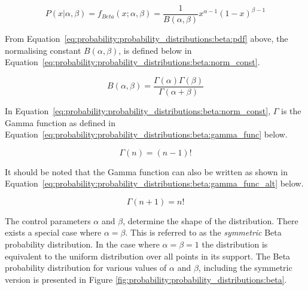 \begin{equation}
      \label{eq:probability:probability_distributions:beta:pdf}
      P(x \vert \alpha, \beta) = f_{Beta}(x; \alpha, \beta) = \frac{1}{B(\alpha, \beta)} x^{\alpha - 1} (1 - x)^{\beta - 1}
\end{equation}

\noindent
From Equation~\eqref{eq:probability:probability_distributions:beta:pdf} above, the normalising constant $B(\alpha, \beta)$, is defined below in Equation~\eqref{eq:probability:probability_distributions:beta:norm_const}.

\begin{equation}
      \label{eq:probability:probability_distributions:beta:norm_const}
      B(\alpha, \beta) = \frac{\Gamma(\alpha)\Gamma(\beta)}{\Gamma(\alpha + \beta)}
\end{equation}

\noindent
In Equation~\eqref{eq:probability:probability_distributions:beta:norm_const}, $\Gamma$ is the Gamma function as defined in Equation~\eqref{eq:probability:probability_distributions:beta:gamma_func} below.

\begin{equation}
      \label{eq:probability:probability_distributions:beta:gamma_func}
      \Gamma(n) = ( n - 1)!
\end{equation}

\noindent
It should be noted that the Gamma function can also be written as shown in Equation~\eqref{eq:probability:probability_distributions:beta:gamma_func_alt} below.

\begin{equation}
      \label{eq:probability:probability_distributions:beta:gamma_func_alt}
      \Gamma(n+1) = n!
\end{equation}

\noindent
The control parameters $\alpha$ and $\beta$, determine the shape of the distribution. There exists a special case where $\alpha = \beta$. This is referred to as the \textit{symmetric} Beta probability distribution. In the case where $\alpha = \beta = 1$ the distribution is equivalent to the uniform distribution over all points in its support. The Beta probability distribution for various values of $\alpha$ and $\beta$, including the symmetric version is presented in Figure \ref{fig:probability:probability_distributions:beta}.

